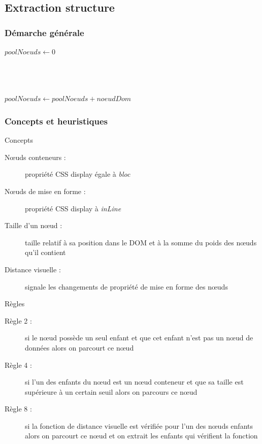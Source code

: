 \documentclass[9pt]{beamer}
\begin{document}
\subsection{Extraction structure}
\begin{frame}
\frametitle{Démarche générale}
\begin{algorithmic}

	\State $poolNoeuds\gets 0$\\ 
	\\
		\\
	\EndFor
\EndFunction
\end{algorithmic}
\vspace{0.5cm}
\begin{algorithmic}
		\\
		\EndFor
	\Else
	\State $poolNoeuds\gets poolNoeuds+noeudDom$
\EndIf
\EndFunction
\end{algorithmic}
\end{frame}

\begin{frame}
\frametitle{Concepts et heuristiques}
\begin{block}{Concepts}
	\begin{description}
		\item[N\oe{}uds conteneurs :]propriété CSS display égale à \emph{bloc} 
		\item[N\oe{}uds de mise en forme :]propriété CSS display à \emph{inLine}
		\item[Taille d'un n\oe{}ud :] taille relatif à sa position dans le DOM et à la somme du poids des n\oe{}uds qu'il contient
		\item[Distance visuelle :] signale les changements de propriété de mise en forme des n\oe{}uds
	\end{description}
\end{block}
\begin{block}{Règles}
\begin{description}
	\item[Règle 2 :] si le n\oe{}ud possède un seul enfant et que cet enfant n'est pas un n\oe{}ud de données alors on parcourt ce n\oe{}ud
	\item[Règle 4 :] si l'un des enfants du n\oe{}ud est un n\oe{}ud conteneur et que sa taille est supérieure à un certain seuil alors on parcours ce n\oe{}ud
	\item[Règle 8 :] si la fonction de distance visuelle est vérifiée pour l'un des n\oe{}uds enfants alors on parcourt ce n\oe{}ud et on extrait les enfants qui vérifient la fonction
\end{description}
\end{block}
\end{frame}
\end{document}
